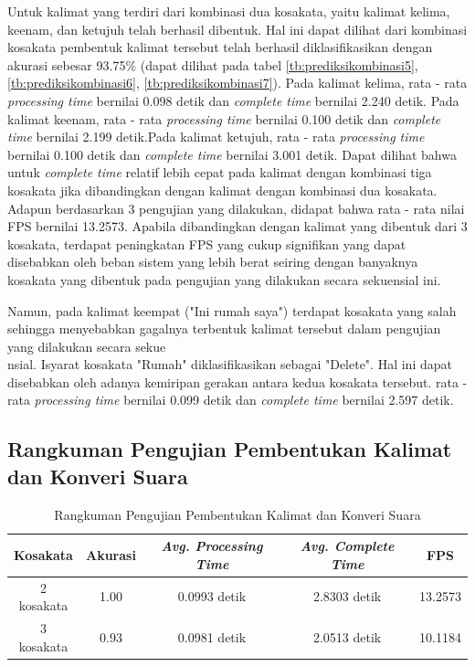 Untuk kalimat yang terdiri dari kombinasi dua kosakata, yaitu kalimat kelima, keenam, dan ketujuh telah berhasil dibentuk. Hal ini dapat dilihat dari kombinasi kosakata pembentuk kalimat tersebut telah berhasil diklasifikasikan dengan akurasi sebesar 93.75\% (dapat dilihat pada tabel \ref{tb:prediksikombinasi5}, \ref{tb:prediksikombinasi6}, \ref{tb:prediksikombinasi7}). Pada kalimat kelima, rata - rata \emph{processing time} bernilai 0.098 detik dan \emph{complete time} bernilai 2.240 detik. Pada kalimat keenam, rata - rata \emph{processing time} bernilai 0.100 detik dan \emph{complete time} bernilai 2.199 detik.Pada kalimat ketujuh, rata - rata \emph{processing time} bernilai 0.100 detik dan \emph{complete time} bernilai 3.001 detik. Dapat dilihat bahwa untuk \emph{complete time} relatif lebih cepat pada kalimat dengan kombinasi tiga kosakata jika dibandingkan dengan kalimat dengan kombinasi dua kosakata. Adapun berdasarkan 3 pengujian yang dilakukan, didapat bahwa rata - rata nilai FPS bernilai 13.2573. Apabila dibandingkan dengan kalimat yang dibentuk dari 3 kosakata, terdapat peningkatan FPS yang cukup signifikan yang dapat disebabkan oleh beban sistem yang lebih berat seiring dengan banyaknya kosakata yang dibentuk pada pengujian yang dilakukan secara sekuensial ini. 

Namun, pada kalimat keempat ("Ini rumah saya") terdapat kosakata yang salah sehingga menyebabkan gagalnya terbentuk kalimat tersebut dalam pengujian yang dilakukan secara sekue\\nsial. Isyarat kosakata "Rumah" diklasifikasikan sebagai "Delete". Hal ini dapat disebabkan oleh adanya kemiripan gerakan antara kedua kosakata tersebut. rata - rata \emph{processing time} bernilai 0.099 detik dan \emph{complete time} bernilai 2.597 detik.

\subsection{Rangkuman Pengujian Pembentukan Kalimat dan Konveri Suara}
\label{sec:analisikalimatsuara}

\begin{longtable}{|c|c|c|c|c|}
  \caption{Rangkuman Pengujian Pembentukan Kalimat dan Konveri Suara}
  \label{tb:evaluasiKalimatdanSuara}                                   \\
  \hline
  \rowcolor[HTML]{C0C0C0}
  \textbf{Kosakata} & \textbf{Akurasi} & \emph{\textbf{Avg. Processing Time}} & \emph{\textbf{Avg. Complete Time}} & \textbf{FPS}\\
  \hline
  2 kosakata & 1.00 & 0.0993 detik & 2.8303 detik & 13.2573  \\
  3 kosakata & 0.93 & 0.0981 detik & 2.0513 detik & 10.1184  \\
  \hline
\end{longtable}

